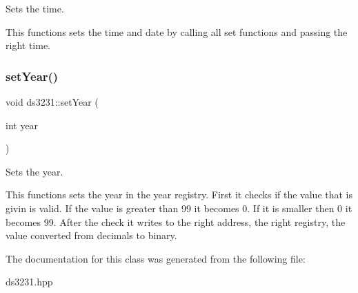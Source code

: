 Sets the time. 

This functions sets the time and date by calling all set functions and passing the right time. \mbox{\label{classds3231_a2fde2f14ed58c3fa990f512beae14611}} 
\subsubsection{\texorpdfstring{set\+Year()}{setYear()}}
{\footnotesize\ttfamily void ds3231\+::set\+Year (\begin{DoxyParamCaption}\item[{int}]{year }\end{DoxyParamCaption})\hspace{0.3cm}{\ttfamily [inline]}}



Sets the year. 

This functions sets the year in the year registry. First it checks if the value that is givin is valid. If the value is greater than 99 it becomes 0. If it is smaller then 0 it becomes 99. After the check it writes to the right address, the right registry, the value converted from decimals to binary. 

The documentation for this class was generated from the following file\+:\begin{DoxyCompactItemize}
\item 
ds3231.\+hpp\end{DoxyCompactItemize}
